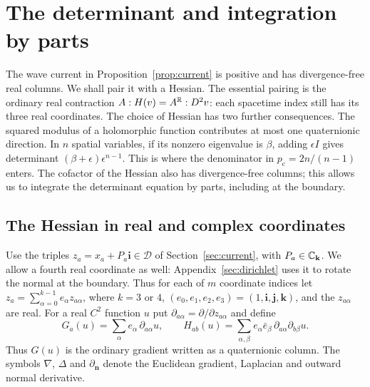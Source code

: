 \section{The determinant and integration by parts}\label{sec:calculus}

The wave current in Proposition~\ref{prop:current} is positive and has
divergence-free real columns. We shall pair it with a Hessian. The
essential pairing is the ordinary real contraction
$A:H(v)=A^{\mathbb R}:D^2v$: each spacetime index still has its three real
coordinates. The choice of Hessian has two further consequences. The squared modulus of a
holomorphic function contributes at most one quaternionic direction.
In $n$ spatial variables, if its nonzero eigenvalue is $\beta$, adding
$\epsilon I$ gives determinant $(\beta+\epsilon)\epsilon^{n-1}$.
This is where the denominator in $p_{\mathrm c}=2n/(n-1)$ enters.
The cofactor of the Hessian also has
divergence-free columns; this allows us to integrate the determinant
equation by parts, including at the boundary.

\subsection{The Hessian in real and complex coordinates}

Use the triples $z_a=x_a+P_a\mathbf i\in\mathcal D$ of
Section~\ref{sec:current}, with $P_a\in\mathbb C_{\mathbf k}$. We allow a
fourth real coordinate as well: Appendix~\ref{sec:dirichlet} uses it to
rotate the normal at the boundary. Thus for each of $m$ coordinate
indices let $z_a=\sum_{\alpha=0}^{k-1} e_\alpha z_{a\alpha}$, where
$k=3$ or $4$, $(e_0,e_1,e_2,e_3)=(1,\mathbf i,\mathbf j,\mathbf k)$,
and the $z_{a\alpha}$ are real.
For a real $C^2$ function $u$ put $\partial_{a\alpha}=\partial/\partial z_{a\alpha}$
and define
\begin{equation}\label{eq:quaternionic-hessian}
  G_a(u)=\sum_\alpha e_\alpha\,\partial_{a\alpha}u,\qquad
  H_{ab}(u)=\sum_{\alpha,\beta} e_\alpha\bar e_\beta\,
                        \partial_{a\alpha}\partial_{b\beta}u .
\end{equation}
Thus $G(u)$ is the ordinary gradient written as a quaternionic column.
The symbols $\nabla$, $\Delta$ and $\partial_{\mathbf n}$ denote the
Euclidean gradient, Laplacian and outward normal derivative.

